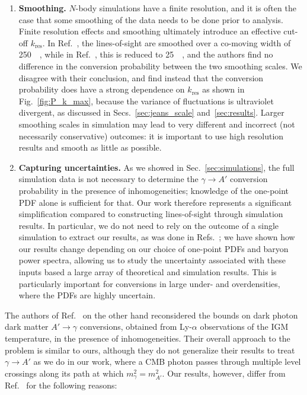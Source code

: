 \documentclass[prd,aps,10pt,nofootinbib,twocolumn,superscriptaddress,preprintnumbers,balancelastpage,longbibliography]{revtex4-1}
\begin{document}
\begin{enumerate}

\item \textbf{Smoothing.} $N$-body simulations have a finite resolution, and it is often the case that some smoothing of the data needs to be done prior to analysis. 
Finite resolution effects and smoothing ultimately introduce an effective cut-off $k_\text{res}$.
In Ref.~\cite{Bondarenko:2020moh}, the lines-of-sight are smoothed over a co-moving width of \SI{250}{\kilo\parsec}, while in Ref.~\cite{Garcia:2020qrp}, this is reduced to \SI{25}{\kilo\parsec}, and the authors find no difference in the conversion probability between the two smoothing scales. 
We disagree with their conclusion, and find instead that the conversion probability does have a strong dependence on $k_\text{res}$ as shown in Fig.~\ref{fig:P_k_max}, because the variance of fluctuations is ultraviolet divergent, as discussed in Secs.~\ref{sec:jeans_scale} and~\ref{sec:results}. 
Larger smoothing scales in simulation may lead to very different and incorrect (not necessarily conservative) outcomes: it is important to use high resolution results and smooth as little as possible.

\item \textbf{Capturing uncertainties.} As we showed in Sec.~\ref{sec:simulations}, the full simulation data is not necessary to determine the $\gamma \to A'$ conversion probability in the presence of inhomogeneities; knowledge of the one-point PDF alone is sufficient for that. 
Our work therefore represents a significant simplification compared to constructing lines-of-sight through simulation results.
In particular, we do not need to rely on the outcome of a single simulation to extract our results, as was done in Refs.~\cite{Bondarenko:2020moh,Garcia:2020qrp}; we have shown how our results change depending on our choice of one-point PDFs and baryon power spectra, allowing us to study the uncertainty associated with these inputs based a large array of theoretical and simulation results. 
This is particularly important for conversions in large under- and overdensities, where the PDFs are highly uncertain. 

\end{enumerate}

The authors of Ref.~\cite{Witte:2020rvb} on the other hand reconsidered the bounds on dark photon dark matter $A' \rightarrow \gamma$ conversions, obtained from Ly-$\alpha$ observations of the IGM temperature, in the presence of inhomogeneities. 
Their overall approach to the problem is similar to ours, although they do not generalize their results to treat $\gamma \to A'$ as we do in our work, where a CMB photon passes through multiple level crossings along its path at which $m_\gamma^2 = m_{A'}^2$. 
Our results, however, differ from Ref.~\cite{Witte:2020rvb} for the following reasons:
\end{document}
